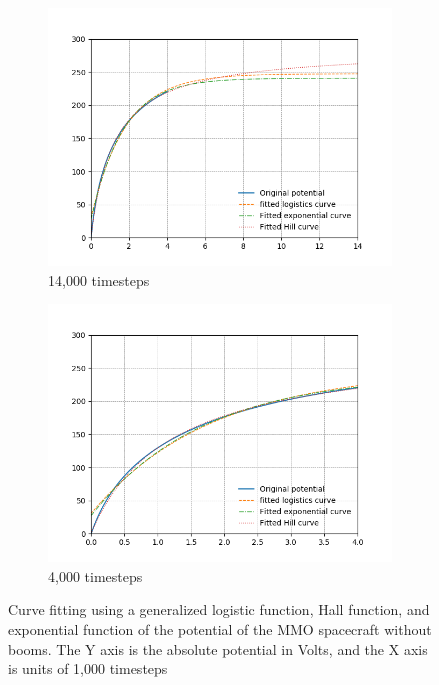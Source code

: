 \begin{center}
\begin{figure}[H]
  \begin{subfigure}[b]{0.61\textwidth}
    \includegraphics[width=\textwidth]{figures/Appendix/C_fit_NB.png}
    \caption{14,000 timesteps}
    \label{fig:C_fit_NB}
  \end{subfigure}
  \hfill
  \begin{subfigure}[b]{0.61\textwidth}
    \includegraphics[width=\textwidth]{figures/Appendix/C_fit_NB_lim.png}
    \caption{4,000 timesteps}
    \label{fig:C_fit_NB_lim}
  \end{subfigure}
  \label{fig:Pot_noPH}
  \caption{Curve fitting using a generalized logistic function, Hall function, and exponential function of the potential of the MMO spacecraft without booms. The Y axis is the absolute potential in Volts, and the X axis is units of 1,000 timesteps}
\end{figure}
\end{center}

